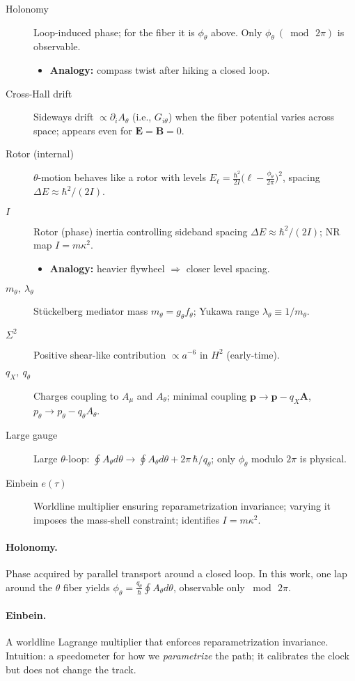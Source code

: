 \begin{description}
  \item[Holonomy] Loop-induced phase; for the fiber it is $\phi_\theta$ above. Only $\phi_\theta\ (\bmod\,2\pi)$ is observable.
    \begin{itemize}
      \item \textbf{Analogy:} compass twist after hiking a closed loop.
    \end{itemize}
  \item[Cross-Hall drift] Sideways drift $\propto\partial_i A_\theta$ (i.e., $G_{i\theta}$) when the fiber potential varies across space; appears even for $\mathbf E=\mathbf B=0$.
  \item[Rotor (internal)] $\theta$-motion behaves like a rotor with levels
    $\displaystyle E_\ell=\frac{\hbar^2}{2I}\Big(\ell-\frac{\phi_\theta}{2\pi}\Big)^2$, spacing $\Delta E\approx \hbar^2/(2I)$.
  \item[$I$] Rotor (phase) inertia controlling sideband spacing $\Delta E\approx \hbar^2/(2I)$; NR map $I=m\kappa^2$.
    \begin{itemize}
      \item \textbf{Analogy:} heavier flywheel $\Rightarrow$ closer level spacing.
    \end{itemize}
  \item[$m_\theta,\ \lambda_\theta$] St\"uckelberg mediator mass $m_\theta=g_\theta f_\theta$; Yukawa range $\lambda_\theta\equiv 1/m_\theta$.
  \item[$\Sigma^2$] Positive shear-like contribution $\propto a^{-6}$ in $H^2$ (early-time).
  \item[$q_X,\ q_\theta$] Charges coupling to $A_\mu$ and $A_\theta$; minimal coupling $\mathbf p\to\mathbf p-q_X\mathbf A$, $p_\theta\to p_\theta-q_\theta A_\theta$.
  \item[Large gauge] Large $\theta$-loop: $\oint A_\theta d\theta\to \oint A_\theta d\theta+2\pi\,\hbar/q_\theta$; only $\phi_\theta$ modulo $2\pi$ is physical.
  \item[Einbein $e(\tau)$] Worldline multiplier ensuring reparametrization invariance; varying it imposes the mass-shell constraint; identifies $I=m\kappa^2$.
\end{description}

  \paragraph{Holonomy.}
  Phase acquired by parallel transport around a closed loop. In this work, one lap around the $\theta$ fiber yields
  $\phi_\theta=\tfrac{q_\theta}{\hbar}\oint A_\theta d\theta$, observable only $\bmod\,2\pi$.

  \paragraph{Einbein.}
  A worldline Lagrange multiplier that enforces reparametrization invariance. Intuition: a speedometer for how we \emph{parametrize} the path; it calibrates the clock but does not change the track.
